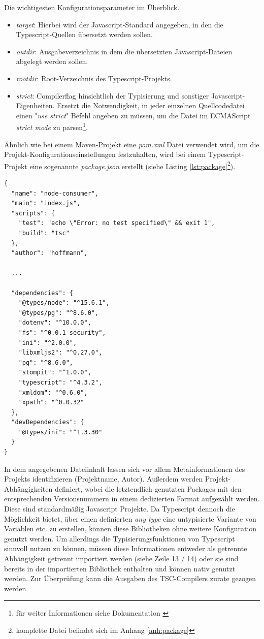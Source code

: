 Die wichtigesten Konfigurationsparameter im Überblick.

\begin{itemize}
  \item \emph{target}: Hierbei wird der Javascript-Standard angegeben, in den die Typescript-Quellen übersetzt werden sollen.
  \item \emph{outdir}: Ausgabeverzeichnis in dem die übersetzten Javascript-Dateien abgelegt werden sollen.
  \item \emph{rootdir}: Root-Verzeichnis des Typescript-Projekts.
  \item \emph{strict}: Compilerflag hinsichtlich der Typisierung und sonstiger Javascript-Eigenheiten. Ersetzt die Notwendigkeit, in jeder einzelnen Quellcodedatei einen "\emph{use strict}" Befehl angeben zu müssen, um die Datei im ECMAScript \emph{strict mode} zu parsen\footnote{für weiter Informationen siehe Dokumentation \cite[Kapitel~tsconfig]{typescript-doc}}.
\end{itemize}

Ähnlich wie bei einem Maven-Projekt eine \emph{pom.xml} Datei verwendet wird, um die Projekt-Konfigurationseinstellungen festzuhalten, wird bei einem Typescript-Projekt eine sogenannte \emph{package.json} erstellt (siehe Listing \ref{lst:package}\footnote{komplette Datei befindet sich im Anhang \ref{anh:package}}).


\begin{lstlisting}[style=javaStyle,caption={Typescript - package.json},label=lst:package]
  {
  "name": "node-consumer",
  "main": "index.js",
  "scripts": {
    "test": "echo \"Error: no test specified\" && exit 1",
    "build": "tsc"
  },
  "author": "hoffmann",

  ...

  "dependencies": {
    "@types/node": "^15.6.1",
    "@types/pg": "^8.6.0",
    "dotenv": "^10.0.0",
    "fs": "^0.0.1-security",
    "ini": "^2.0.0",
    "libxmljs2": "^0.27.0",
    "pg": "^8.6.0",
    "stompit": "^1.0.0",
    "typescript": "^4.3.2",
    "xmldom": "^0.6.0",
    "xpath": "^0.0.32"
  },
  "devDependencies": {
    "@types/ini": "^1.3.30"
  }
}
\end{lstlisting}

In dem angegebenen Dateiinhalt lassen sich vor allem Metainformationen des Projekts identifizieren (Projektname, Autor). Außerdem werden Projekt-Abhängigkeiten definiert, wobei die letztendlich genutzten Packages mit den entsprechenden Versionsnummern in einem dedizierten Format aufgezählt werden. Diese sind standardmäßig Javascript Projekte. Da Typescript dennoch die Möglichkeit bietet, über einen definierten \emph{any type} eine untypisierte Variante von Variablen etc. zu erstellen, können diese Bibliotheken ohne weitere Konfiguration genutzt werden. Um allerdings die Typisierungsfunktionen von Typescript sinnvoll nutzen zu können, müssen diese Informationen entweder als getrennte Abhängigkeit getrennt importiert werden (siehe Zeile 13 / 14) oder sie sind bereits in der importierten Bibliothek enthalten und können nativ genutzt werden. Zur Überprüfung kann die Ausgaben des TSC-Compilers zurate gezogen werden.

